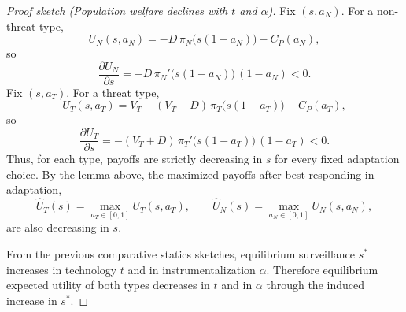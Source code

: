 \documentclass[11pt,a4paper]{article}
\theoremstyle{definition}
\theoremstyle{remark}
\theoremstyle{definition}
\begin{document}
\begin{proof}[Proof sketch (Population welfare declines with $t$ and $\alpha$)]
Fix $(s,a_N)$. For a non-threat type,
$$
U_N(s,a_N)
=
-D\,\pi_N\!\bigl(s(1-a_N)\bigr)
-
C_P(a_N),
$$
so
$$
\frac{\partial U_N}{\partial s}
=
-D\,\pi_N'\!\bigl(s(1-a_N)\bigr)\,(1-a_N)
<
0.
$$
Fix $(s,a_T)$. For a threat type,
$$
U_T(s,a_T)
=
V_T
-
(V_T+D)\,\pi_T\!\bigl(s(1-a_T)\bigr)
-
C_P(a_T),
$$
so
$$
\frac{\partial U_T}{\partial s}
=
-(V_T+D)\,\pi_T'\!\bigl(s(1-a_T)\bigr)\,(1-a_T)
<
0.
$$
Thus, for each type, payoffs are strictly decreasing in $s$ for every fixed adaptation choice. By the lemma above, the maximized payoffs after best-responding in adaptation,
$$
\widehat U_T(s)=\max_{a_T\in[0,1]}U_T(s,a_T),
\qquad
\widehat U_N(s)=\max_{a_N\in[0,1]}U_N(s,a_N),
$$
are also decreasing in $s$.

From the previous comparative statics sketches, equilibrium surveillance $s^*$ increases in technology $t$ and in instrumentalization $\alpha$. Therefore equilibrium expected utility of both types decreases in $t$ and in $\alpha$ through the induced increase in $s^*$.
\end{proof}
\end{document}
